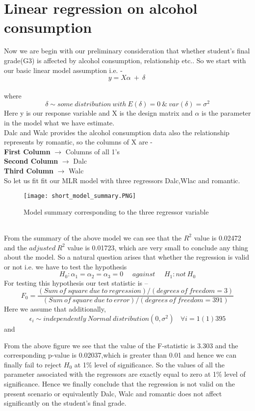 \documentclass[A4paper,11pt]{report}
\begin{document}
	\section{Linear regression on alcohol consumption}
	Now we are begin with our preliminary consideration that whether student's final grade(G3) is affected by alcohol consumption, relationship etc..
	So we start with our basic linear model assumption i.e. -
	$$y = X\alpha\ +\ \delta \ $$\\
	where
	\begin{equation} 
		\delta \sim some\ distribution\ with\ E(\delta)=0\ \&\ var(\delta)=\sigma^2
	\end{equation}
	 Here y is our response variable and X is the design matrix and $\alpha$ is the parameter in the model what we have estimate.\\
	 Dalc and Walc provides the alcohol consumption data also the relationship represents by romantic, so the columns of X are - \\
	 \textbf{First Column} $\rightarrow$ Columns of all 1's\\
	 \textbf{Second Column} $\rightarrow$ Dalc\\
	 \textbf{Third Column} $\rightarrow$ Walc\\
	 So let us fit fit our MLR model with three regressors Dalc,Wlac and romantic.\\
	 \begin{figure}[h]
	 	\texttt{[image: short\_model\_summary.PNG]}
	 	\caption{Model summary corresponding to the three regressor variable}
	 \end{figure}\\
	 From the summary of the above model we can see that the $R^2$ value is 0.02472 and the $adjusted\ R^2$ value is 0.01723, which are very small to conclude any thing about the model. So a natural question arises that whether the regression is valid or not i.e. we have to test the hypothesis 
	 $$H_0 : \alpha_1 = \alpha_2 = \alpha_3 = 0\ \ \ \ \ \  against \ \ \ \ \ \ H_1 : not\ H_0$$
	 For testing this hypothesis our test statistic is --\\
	 $$F_0 = \frac{(Sum\ of\ square\ due\ to\ regression)/(degrees\ of\ freedom = 3)}{(Sum\ of\ square\ due\ to\ error)/(degrees\ of\ freedom = 391)}$$
	 Here we assume that additionally,
	 $$\epsilon_i \sim independently\ Normal\ distribution(0,\sigma^2)\ \ \ \ \forall i= 1(1)395$$
	 and
	 
	 From the above figure we see that the value of the F-statistic is 3.303 and the corresponding p-value is 0.02037,which is greater than 0.01 and hence we can finally fail to reject $H_0$ at 1\% level of significance. So the values of all the parameter associated with the regressors are exactly equal to zero at 1\% level of significance. Hence we finally conclude that the regression is not valid on the present scenario or equivalently Dalc, Walc and romantic does not affect significantly on the student's final grade.
\end{document}
